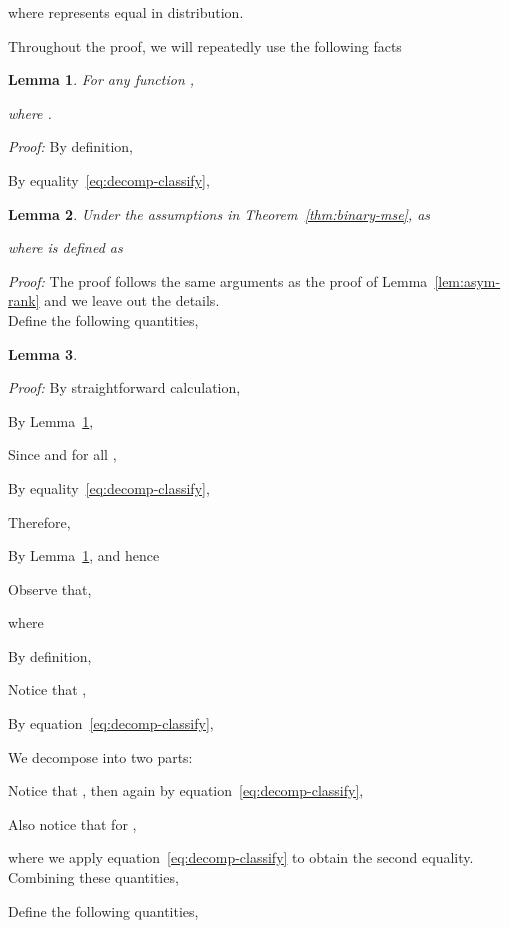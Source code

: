 \documentclass[11pt,a4paper]{article}
\newtheorem{lemma}{Lemma}[section]
\begin{document}
where  represents equal in distribution. 

Throughout the proof, we will repeatedly use the following facts 


\begin{lemma}
For any function , 

where .
\label{lem:integral-classify}
\end{lemma}
{\em Proof: }
By definition, 

By equality~\eqref{eq:decomp-classify}, 



\begin{lemma}
  Under the assumptions in Theorem~\ref{thm:binary-mse}, as 

where  is defined as 

\label{lem:asym-binary}
\end{lemma}
{\em Proof: } The proof follows the same arguments as the proof of Lemma~\ref{lem:asym-rank} and we leave out the details.\\ 


Define the following quantities, 



\begin{lemma}
  
  
  \label{lem:variance-binary}
\end{lemma}
{\em Proof: }
By straightforward calculation,


By Lemma~\ref{lem:integral-classify}, 

Since  and  for all , 

By equality~\eqref{eq:decomp-classify}, 

Therefore, 

By Lemma~\ref{lem:integral-classify},  and hence 

Observe that,

where 

By definition, 

Notice that , 

By equation~\eqref{eq:decomp-classify},

We decompose  into two parts:

Notice that , then again by equation~\eqref{eq:decomp-classify},


Also notice that  for , 

where we apply equation~\eqref{eq:decomp-classify} to obtain the second equality. Combining these quantities, 



Define the following quantities,
\end{document}
